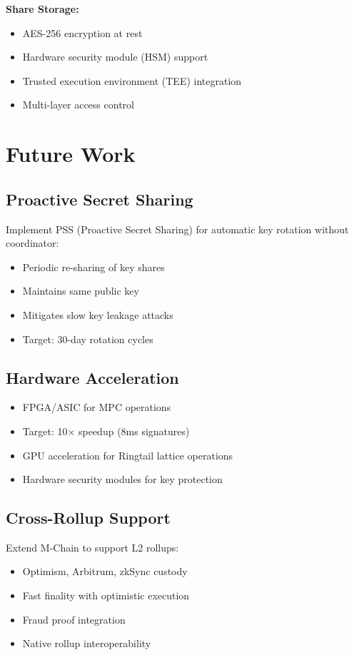 \documentclass[11pt]{article}
\begin{document}
\textbf{Share Storage:}
\begin{itemize}
\item AES-256 encryption at rest
\item Hardware security module (HSM) support
\item Trusted execution environment (TEE) integration
\item Multi-layer access control
\end{itemize}

\section{Future Work}

\subsection{Proactive Secret Sharing}

Implement PSS (Proactive Secret Sharing) for automatic key rotation without coordinator:
\begin{itemize}
\item Periodic re-sharing of key shares
\item Maintains same public key
\item Mitigates slow key leakage attacks
\item Target: 30-day rotation cycles
\end{itemize}

\subsection{Hardware Acceleration}

\begin{itemize}
\item FPGA/ASIC for MPC operations
\item Target: 10× speedup (8ms signatures)
\item GPU acceleration for Ringtail lattice operations
\item Hardware security modules for key protection
\end{itemize}

\subsection{Cross-Rollup Support}

Extend M-Chain to support L2 rollups:
\begin{itemize}
\item Optimism, Arbitrum, zkSync custody
\item Fast finality with optimistic execution
\item Fraud proof integration
\item Native rollup interoperability
\end{itemize}
\end{document}
